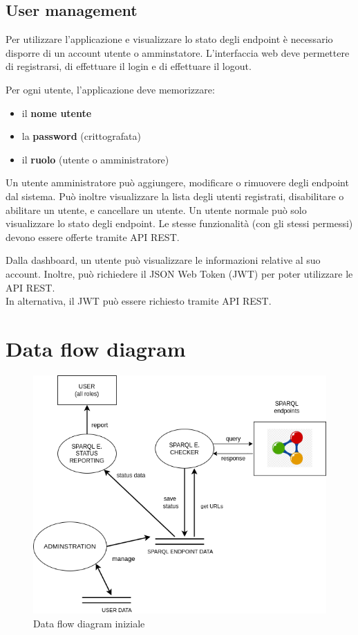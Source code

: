 \documentclass{article}
\begin{document}
\subsection{User management}

Per utilizzare l'applicazione e visualizzare lo stato degli endpoint è necessario disporre di un account utente o amminstatore.
L'interfaccia web deve permettere di registrarsi, di effettuare il login e di effettuare il logout.

Per ogni utente, l'applicazione deve memorizzare:
\begin{itemize}
    \item il \textbf{nome utente}
    \item la \textbf{password} (crittografata)
    \item il \textbf{ruolo} (utente o amministratore)
\end{itemize}

Un utente amministratore può aggiungere, modificare o rimuovere degli endpoint dal sistema.
Può inoltre visualizzare la lista degli utenti registrati, disabilitare o abilitare un utente, e cancellare un utente.
Un utente normale può solo visualizzare lo stato degli endpoint.
Le stesse funzionalità (con gli stessi permessi) devono essere offerte tramite API REST.

Dalla dashboard, un utente può visualizzare le informazioni relative al suo account.
Inoltre, può richiedere il JSON Web Token (JWT) per poter utilizzare le API REST.\\
In alternativa, il JWT può essere richiesto tramite API REST.

\clearpage
\section{Data flow diagram}
\label{sec:data-flow-diagram}

\begin{figure}[h]
    \centering
    \includegraphics[width=1\textwidth]{dfd_sparql.png}
    \caption{Data flow diagram iniziale}
\end{figure}
\end{document}
